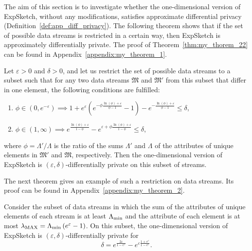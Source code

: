 The aim of this section is to investigate whether the one-dimensional version of ExpSketch, without any modifications, satisfies approximate differential privacy (Definition~\ref{def:app_diff_privacy}). The following theorem shows that if the set of possible data streams is restricted in a certain way, then ExpSketch is approximately differentially private. The proof of Theorem~\ref{thm:my_thorem_22} can be found in Appendix~\ref{appendix:my_theorem_1}.

\begin{theorem}
\label{thm:my_thorem_22}
Let $\varepsilon > 0$ and $\delta > 0$, and let us restrict the set of possible data streams to a subset such that for any two data streams $\mathfrak{M}$ and $\mathfrak{M}'$ from this subset that differ in one element, the following conditions are fulfilled:
\begin{enumerate}
  \item $\phi \in (0, e^{-\varepsilon}) \implies 1 + e^{\varepsilon}\left(e^{-\phi\frac{\ln(\phi) + \varepsilon}{\phi - 1}} - 1\right) - e^{-\frac{\ln(\phi) + \varepsilon}{\phi - 1}} \leq \delta$,
  \item $\phi \in (1, \infty) \implies e^{\frac{\ln(\phi) + \varepsilon}{1-\phi}} - e^{\varepsilon + \phi \frac{\ln(\phi) + \varepsilon}{1-\phi}} \leq \delta$,
\end{enumerate}
where $\phi = \Lambda' / \Lambda$ is the ratio of the sums $\Lambda'$ and $\Lambda$ of the attributes of unique elements in $\mathfrak{M}'$ and $\mathfrak{M}$, respectively. Then the one-dimensional version of ExpSketch is $(\varepsilon, \delta)$-differentially private on this subset of streams.
\end{theorem}

The next theorem gives an example of such a restriction on data streams. Its proof can be found in Appendix~\ref{appendix:my_theorem_2}.

\begin{theorem}
\label{thm:my_thorem_24}
Consider the subset of data streams in which the sum of the attributes of unique elements of each stream is at least $\Lambda_{\min}$ and the attribute of each element is at most $\lambda_{\mathrm{MAX}} = \Lambda_{\min}\left(e^{\varepsilon} - 1\right)$. On this subset, the one-dimensional version of ExpSketch is $(\varepsilon, \delta)$-differentially private for
\[
\delta = e^{\frac{2\varepsilon}{1 - e^{\varepsilon}}} - e^{\varepsilon\frac{1 + e^{\varepsilon}}{1 - e^{\varepsilon}}}.
\]
\end{theorem}

